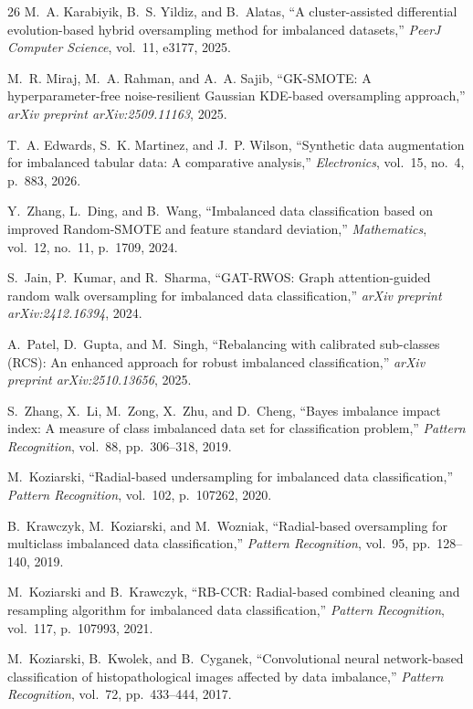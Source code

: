 \documentclass{ijSmartGrid}
\theoremstyle{definition}
\begin{document}
\begin{thebibliography}{26}
M.~A. Karabiyik, B.~S. Yildiz, and B.~Alatas,
``A cluster-assisted differential evolution-based hybrid oversampling method for imbalanced datasets,''
\emph{PeerJ Computer Science}, vol.~11, e3177, 2025.

M.~R. Miraj, M.~A. Rahman, and A.~A. Sajib,
``GK-SMOTE: A hyperparameter-free noise-resilient Gaussian KDE-based oversampling approach,''
\emph{arXiv preprint arXiv:2509.11163}, 2025.

T.~A. Edwards, S.~K. Martinez, and J.~P. Wilson,
``Synthetic data augmentation for imbalanced tabular data: A comparative analysis,''
\emph{Electronics}, vol.~15, no.~4, p.~883, 2026.

Y.~Zhang, L.~Ding, and B.~Wang,
``Imbalanced data classification based on improved Random-SMOTE and feature standard deviation,''
\emph{Mathematics}, vol.~12, no.~11, p.~1709, 2024.

S.~Jain, P.~Kumar, and R.~Sharma,
``GAT-RWOS: Graph attention-guided random walk oversampling for imbalanced data classification,''
\emph{arXiv preprint arXiv:2412.16394}, 2024.

A.~Patel, D.~Gupta, and M.~Singh,
``Rebalancing with calibrated sub-classes (RCS): An enhanced approach for robust imbalanced classification,''
\emph{arXiv preprint arXiv:2510.13656}, 2025.

S.~Zhang, X.~Li, M.~Zong, X.~Zhu, and D.~Cheng,
``Bayes imbalance impact index: A measure of class imbalanced data set for classification problem,''
\emph{Pattern Recognition}, vol.~88, pp.~306--318, 2019.

M.~Koziarski,
``Radial-based undersampling for imbalanced data classification,''
\emph{Pattern Recognition}, vol.~102, p.~107262, 2020.

B.~Krawczyk, M.~Koziarski, and M.~Wozniak,
``Radial-based oversampling for multiclass imbalanced data classification,''
\emph{Pattern Recognition}, vol.~95, pp.~128--140, 2019.

M.~Koziarski and B.~Krawczyk,
``RB-CCR: Radial-based combined cleaning and resampling algorithm for imbalanced data classification,''
\emph{Pattern Recognition}, vol.~117, p.~107993, 2021.

M.~Koziarski, B.~Kwolek, and B.~Cyganek,
``Convolutional neural network-based classification of histopathological images affected by data imbalance,''
\emph{Pattern Recognition}, vol.~72, pp.~433--444, 2017.


\end{thebibliography}
\end{document}
